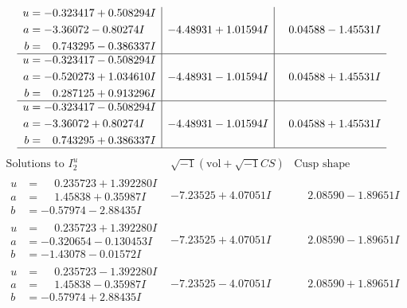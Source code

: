 \documentclass[1p]{elsarticle_modified}
\theoremstyle{definition}
\newcommand{\I}{\sqrt{-1}}
\begin{document}
$$\begin{array}{c|c|c}
\begin{aligned}
u &= -0.323417 + 0.508294 I \\
a &= -3.36072 - 0.80274 I \\
b &= \phantom{-}0.743295 - 0.386337 I\end{aligned}
 & -4.48931 + 1.01594 I & \phantom{-}0.04588 - 1.45531 I \\ \hline\begin{aligned}
u &= -0.323417 - 0.508294 I \\
a &= -0.520273 + 1.034610 I \\
b &= \phantom{-}0.287125 + 0.913296 I\end{aligned}
 & -4.48931 - 1.01594 I & \phantom{-}0.04588 + 1.45531 I \\ \hline\begin{aligned}
u &= -0.323417 - 0.508294 I \\
a &= -3.36072 + 0.80274 I \\
b &= \phantom{-}0.743295 + 0.386337 I\end{aligned}
 & -4.48931 - 1.01594 I & \phantom{-}0.04588 + 1.45531 I\\
 \hline 
 \end{array}$$\newpage$$\begin{array}{c|c|c}  
\text{Solutions to }I^u_{2}& \I (\text{vol} + \sqrt{-1}CS) & \text{Cusp shape}\\
 \hline 
\begin{aligned}
u &= \phantom{-}0.235723 + 1.392280 I \\
a &= \phantom{-}1.45838 + 0.35987 I \\
b &= -0.57974 - 2.88435 I\end{aligned}
 & -7.23525 + 4.07051 I & \phantom{-}2.08590 - 1.89651 I \\ \hline\begin{aligned}
u &= \phantom{-}0.235723 + 1.392280 I \\
a &= -0.320654 - 0.130453 I \\
b &= -1.43078 - 0.01572 I\end{aligned}
 & -7.23525 + 4.07051 I & \phantom{-}2.08590 - 1.89651 I \\ \hline\begin{aligned}
u &= \phantom{-}0.235723 - 1.392280 I \\
a &= \phantom{-}1.45838 - 0.35987 I \\
b &= -0.57974 + 2.88435 I\end{aligned}
 & -7.23525 - 4.07051 I & \phantom{-}2.08590 + 1.89651 I \\ \hline\begin{aligned}

\end{aligned}
\end{array}$$
\end{document}
